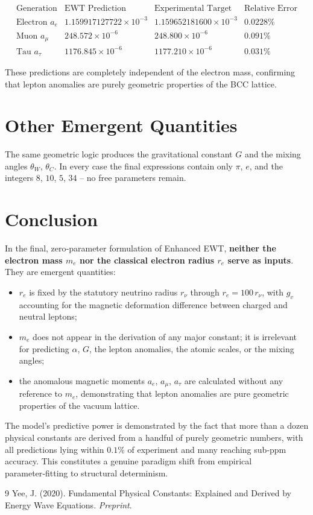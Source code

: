 \documentclass{article}
\begin{document}
	\[
	\begin{array}{lccc}
		\text{Generation} & \text{EWT Prediction} & \text{Experimental Target} & \text{Relative Error}\\\hline
		\text{Electron } a_e & 1.159917127722\times10^{-3} & 1.159652181600\times10^{-3} & 0.0228\%\\
		\text{Muon } a_\mu & 248.572\times10^{-6} & 248.800\times10^{-6} & 0.091\%\\
		\text{Tau } a_\tau & 1176.845\times10^{-6} & 1177.210\times10^{-6} & 0.031\%
	\end{array}
	\]
	
	These predictions are completely independent of the electron mass, confirming that lepton anomalies are purely geometric properties of the BCC lattice.
	
	\section{Other Emergent Quantities}
	The same geometric logic produces the gravitational constant $G$ and the mixing angles $\theta_W$, $\theta_C$. In every case the final expressions contain only $\pi$, $e$, and the integers $8$, $10$, $5$, $34$ – no free parameters remain.
	
	\section{Conclusion}
	In the final, zero‑parameter formulation of Enhanced EWT, \textbf{neither the electron mass $m_e$ nor the classical electron radius $r_e$ serve as inputs}. They are emergent quantities:
	\begin{itemize}
		\item $r_e$ is fixed by the statutory neutrino radius $r_\nu$ through $r_e = 100\,r_\nu$, with $g_v$ accounting for the magnetic deformation difference between charged and neutral leptons;
		\item $m_e$ does not appear in the derivation of any major constant; it is irrelevant for predicting $\alpha$, $G$, the lepton anomalies, the atomic scales, or the mixing angles;
		\item the anomalous magnetic moments $a_e$, $a_\mu$, $a_\tau$ are calculated without any reference to $m_e$, demonstrating that lepton anomalies are pure geometric properties of the vacuum lattice.
	\end{itemize}
	The model's predictive power is demonstrated by the fact that more than a dozen physical constants are derived from a handful of purely geometric numbers, with all predictions lying within $0.1\%$ of experiment and many reaching sub‑ppm accuracy. This constitutes a genuine paradigm shift from empirical parameter‑fitting to structural determinism.
	
	\begin{thebibliography}{9}
		 Yee, J. (2020). Fundamental Physical Constants: Explained and Derived by Energy Wave Equations. \textit{Preprint}.
	\end{thebibliography}
	
\end{document}
